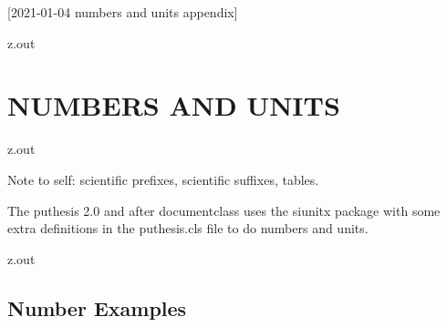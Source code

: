 [2021-01-04 numbers and units appendix]

%





\begin{VerbatimOut}{z.out}
\chapter{NUMBERS AND UNITS}
\end{VerbatimOut}

\MyIO


\begin{VerbatimOut}{z.out}

Note to self: scientific prefixes, scientific suffixes, tables.

The puthesis 2.0 and after documentclass uses the siunitx
package with some extra definitions in the puthesis.cls
file to do numbers and units.
\end{VerbatimOut}

\MyIO


\begin{VerbatimOut}{z.out}

\section{Number Examples}
\end{VerbatimOut}

\MyIO


